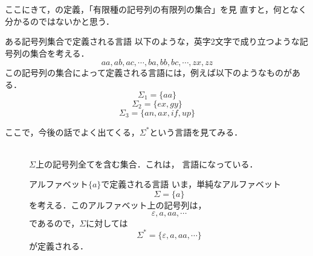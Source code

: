 ここにきて，の定義，「有限種の記号列の有限列の集合」を見
直すと，何となく分かるのではないかと思う．
\begin{myexample}{ある記号列集合で定義される言語}
 以下のような，英字2文字で成り立つような記号列の集合を考える．
 \[
  aa, ab, ac, \cdots , ba, bb, bc, \cdots , zx, zz
 \]
 この記号列の集合によって定義される言語には，例えば以下のようなものがあ
 る．
 \[
  \Sigma_1 = \{aa\}
 \]
 \[
  \Sigma_2 = \{ex, gy\}
 \]
 \[
  \Sigma_3 = \{an, ax, if, up\}
 \]
\end{myexample}

ここで，今後の話でよく出てくる，$\Sigma^*$という言語を見てみる．
\begin{description}
 \item [\mystrong{$\Sigma^*$}] \mbox{} \\
 $\Sigma$上の記号列全てを含む集合．これは，
            言語になっている．
            \begin{myexample}{アルファベット$\{a\}$で定義される言語}
             いま，単純なアルファベット
             \[
              \Sigma = \{a\}
             \]
             を考える．このアルファベット上の記号列は，
             \[
              \varepsilon, a, aa, \cdots 
             \]
             であるので，$\Sigma$に対しては
             \[
              \Sigma^* = \{\varepsilon, a, aa, \cdots \}
             \]
             が定義される．
            \end{myexample}
\end{description}

